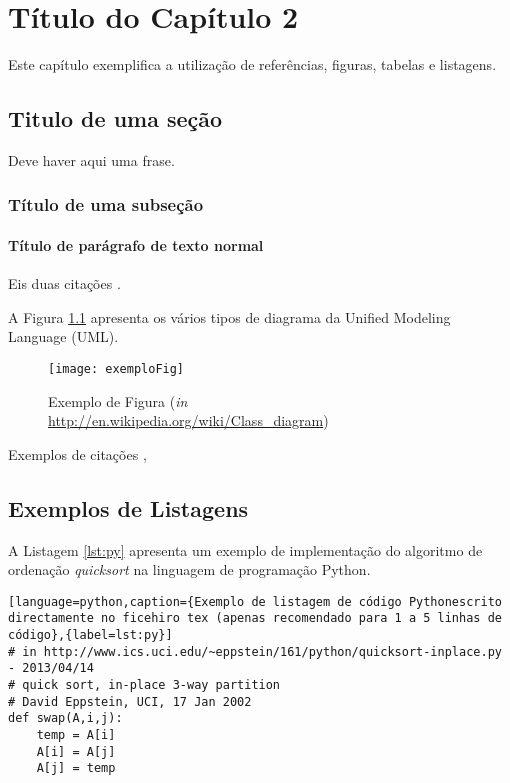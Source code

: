 \chapter{Título do Capítulo 2}
\label{cap2}

Este capítulo exemplifica a utilização de referências, figuras, tabelas e listagens.

\section{Titulo de uma seção}
Deve haver aqui uma frase.

\subsection{Título de uma subseção}
\subsubsection{Título de parágrafo de texto normal}

Eis duas citações \cite{book:Brooks1995,Chen1976}.

A Figura \ref{fig:exemplofig} apresenta os vários tipos de diagrama da Unified Modeling Language (UML).

\begin{figure}[!htb]
\centering
\texttt{[image: exemploFig]}
\caption{Exemplo de Figura (\textit{in} \url{http://en.wikipedia.org/wiki/Class_diagram})}
\label{fig:exemplofig}
\end{figure}

Exemplos de citações \cite{AndroidDoc},
\cite{Huetal2000,book:Brooks1995,Chen1976}


\section{Exemplos de Listagens}

A Listagem \ref{lst:py} apresenta um exemplo de implementação do algoritmo de ordenação \textit{quicksort} na linguagem de programação Python.

\begin{lstlisting}[language=python,caption={Exemplo de listagem de código Pythonescrito directamente no ficehiro tex (apenas recomendado para 1 a 5 linhas de código},{label=lst:py}]
# in http://www.ics.uci.edu/~eppstein/161/python/quicksort-inplace.py - 2013/04/14
# quick sort, in-place 3-way partition
# David Eppstein, UCI, 17 Jan 2002
def swap(A,i,j):
	temp = A[i]
	A[i] = A[j]
	A[j] = temp
\end{lstlisting}


